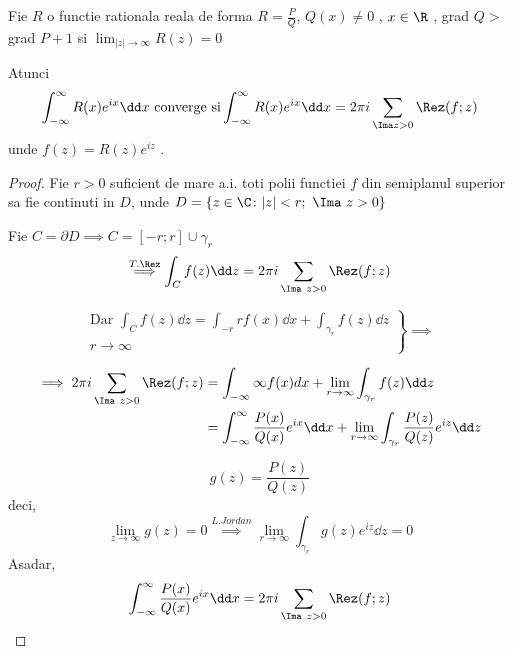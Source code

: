 \begin{tip}
    Fie $R$ o functie rationala reala de forma
             $\displaystyle R = \frac{P}{Q}$,
             $Q(x) \neq 0$ ,
             $ x \in \R$ ,
             grad $Q >$ grad  $P+1$ si
             $\displaystyle \lim_{|z|\to\infty} R(z) = 0  $

             Atunci
             \[
                    \int_{- \infty}^{\infty} R(x) e^{ix} \dd x \text{ converge si}
                    \int_{- \infty}^{\infty} R(x) e^{ix} \dd x = 2 \pi i \sum_{\Ima z >0} \Rez(f;z)
              \]
            unde $f(z) = R(z) e^{iz}$ .

    \begin{proof}
        Fie $r>0$ suficient de mare a.i. toti polii functiei $f$ din semiplanul superior
        sa fie continuti in $D$, unde $D=\{z\in\C \colon |z| < r ;\ \Ima\ z >0\}$

        Fie $C = \partial D \implies C = [-r;r] \cup \gamma_r$
        \[
            \overset{T.\Rez}{\implies} \int_{C} f(z) \dd z = 2 \pi i \sum_{\Ima\ z >0} \Rez(f;z)
        \]

        \begin{displaymath}
            \left.
                \begin{aligned}
                    \text{Dar } \int_{C} f(z) \dd z
                        = \int_{-r}{r} f(x) \dd x + \int_{\gamma_r} f(z) \dd z \\
                        r \to \infty
                \end{aligned}
            \right \}
            \implies
        \end{displaymath}

        \begin{align*}
            \implies 2\pi i \sum_{\Ima\ z >0 } \Rez(f;z)
                &= \int_{-\infty}{\infty} f(x) dx + \lim_{r\to\infty} \int_{\gamma_r} f(z) \dd z
            \\
                &= \int_{-\infty}^{\infty} \frac{P(x)}{Q(x)} e^{ix} \dd x
                   + \lim_{r\to\infty} \int_{\gamma_r} \frac{P(z)}{Q(z)} e^{iz} \dd z
        \end{align*}

        \[
            g(z) = \frac{P(z)}{Q(z)}
        \]
        deci,
        \[
            \lim_{z\to\infty}g(z) = 0 \overset{L.Jordan}{\implies}
            \lim_{r\to\infty} \int_{\gamma_r} g(z) e^{iz} \dd z = 0
        \]
        Asadar,
        \[
            \int_{-\infty}^{\infty} \frac{P(x)}{Q(x)} e^{ix} \dd x
                =2 \pi i \sum_{\Ima\ z >0} \Rez(f;z)
        \]
    \end{proof}
\end{tip}

